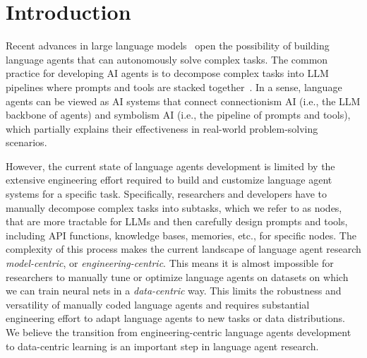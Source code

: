 \section{Introduction}

Recent advances in large language models~\citep{gpt,gpt2,gpt3,gpt3.5,gpt4,llama,llama2} open the possibility of building language agents that can autonomously solve complex tasks. The common practice for developing AI agents is to decompose complex tasks into LLM pipelines where prompts and tools are stacked together~\citep{park2023generative,hong2023metagpt,zhou2023agents,chen2023agentverse,OpenAgents}. In a sense, language agents can be viewed as AI systems that connect connectionism AI (i.e., the LLM backbone of agents) and symbolism AI (i.e., the pipeline of prompts and tools), which partially explains their effectiveness in real-world problem-solving scenarios.

However, the current state of language agents development is limited by the extensive engineering effort required to build and customize language agent systems for a specific task. Specifically, researchers and developers have to manually decompose complex tasks into subtasks, which we refer to as nodes, that are more tractable for LLMs and then carefully design prompts and tools, including API functions, knowledge bases, memories, etc., for specific nodes. The complexity of this process makes the current landscape of language agent research \textit{model-centric}, or \textit{engineering-centric}. This means it is almost impossible for researchers to manually tune or optimize language agents on datasets on which we can train neural nets in a \textit{data-centric} way. This limits the robustness and versatility of manually coded language agents and requires substantial engineering effort to adapt language agents to new tasks or data distributions. We believe the transition from engineering-centric language agents development to data-centric learning is an important step in language agent research.

